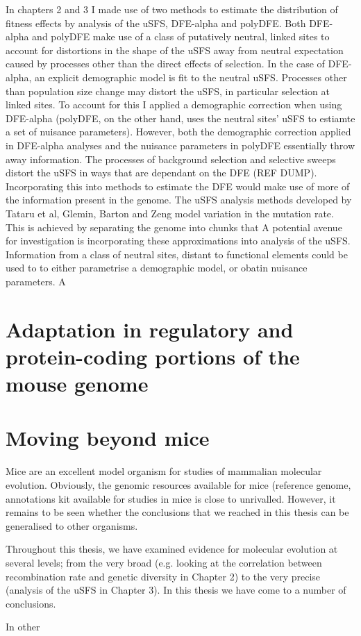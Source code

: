 In chapters 2 and 3 I made use of two methods to estimate the distribution of fitness effects by analysis of the uSFS, DFE-alpha and polyDFE. Both DFE-alpha and polyDFE make use of a class of putatively neutral, linked sites to account for distortions in the shape of the uSFS away from  neutral expectation caused by processes other than the direct effects of selection. In the case of DFE-alpha, an explicit demographic model is fit to the neutral uSFS. Processes other than population size change may distort the uSFS, in particular selection at linked sites. To account for this I applied a demographic correction when using DFE-alpha (polyDFE, on the other hand, uses the neutral sites' uSFS to estiamte a set of  nuisance parameters). However, both the demographic correction applied in DFE-alpha analyses and the nuisance parameters in polyDFE essentially throw away information. The processes of background selection and selective sweeps distort the uSFS in ways that are dependant on the DFE (REF DUMP). 
Incorporating this into methods to estimate the DFE would make use of more of the information present in the genome. The uSFS analysis methods developed by Tataru et al, Glemin, Barton and Zeng model variation in the mutation rate. This is achieved by separating the genome into chunks that 
A potential avenue for investigation is incorporating these approximations into analysis of the uSFS. Information from a class of neutral sites, distant to functional elements could be used to to either parametrise a demographic model, or obatin nuisance parameters. A 



\section{Adaptation in regulatory and protein-coding portions of the mouse genome}



\section{Moving beyond mice}

Mice are an excellent model organism for studies of mammalian molecular evolution. Obviously, the genomic resources available for mice (reference genome, annotations  kit available for studies in mice is close to unrivalled. 
However, it remains to be seen whether the conclusions that we reached in this thesis can be generalised to other organisms. 
 
Throughout this thesis, we have examined evidence for molecular evolution at several levels; from the very broad (e.g. looking at the correlation between recombination rate and genetic diversity in Chapter 2) to the very precise (analysis of the uSFS in Chapter 3). In this thesis we have come to a number of conclusions. 

In other 

